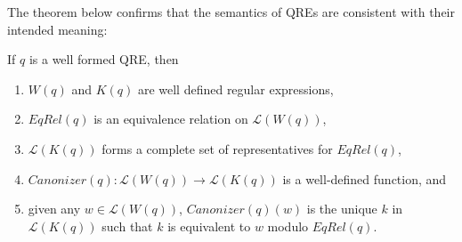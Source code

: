 \documentclass{svproc}
\begin{document}
The theorem below confirms that the semantics of QREs are consistent with their
intended meaning:
\begin{theorem}
If $q$ is a well formed QRE, then
\begin{enumerate}
  \item $W(q)$ and $K(q)$ are well defined regular expressions,
  \item  $EqRel(q)$ is an equivalence relation on $\mathcal{L}(W(q))$,
  \item  $\mathcal{L}(K(q))$ forms a complete set of representatives for
  $EqRel(q)$,
  \item $Canonizer(q):\mathcal{L}(W(q)) \longrightarrow \mathcal{L}(K(q))$ is a
  well-defined function, and
  \item  given any $w \in \mathcal{L}(W(q))$, $Canonizer(q)(w)$ is the unique
  $k$ in $\mathcal{L}(K(q))$ such that $k$ is equivalent to $w$ modulo
  $EqRel(q)$.
  \end{enumerate}
\end{theorem}
\end{document}
